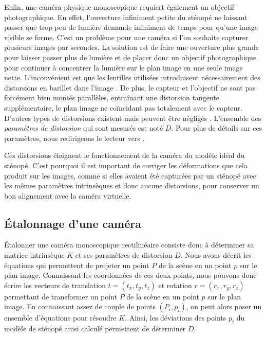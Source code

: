 Enfin, une caméra physique monoscopique requiert également un objectif photographique. En effet, l'ouverture infiniment petite du sténopé ne laissant passer que trop peu de lumière demande infiniment de temps pour qu'une image visible se forme. C'est un problème pour une caméra si l'on souhaite capturer plusieurs images par secondes. La solution est de faire une ouverture plus grande pour laisser passer plus de lumière et de placer donc un objectif photographique pour continuer à concentrer la lumière sur le plan image en une seule image nette. L'inconvénient est que les lentilles utilisées introduisent nécessairement des distorsions en barillet dans l'image . De plus, le capteur et l'objectif ne sont pas forcément bien montés parallèles, entraînant une distorsion tangente supplémentaire, le plan image ne coïncidant pas totalement avec le capteur. D'autres types de distorsions existent mais peuvent être négligés \citep[p. 377]{Bradski2008}. L'ensemble des \emph{paramètres de distorsion} qui sont mesurés est noté $D$. Pour plus de détails sur ces paramètres, nous redirigeons le lecteur vers \cite[p. 375]{Bradski2008}.


Ces distorsions éloignent le fonctionnement de la caméra du modèle idéal du sténopé. C'est pourquoi il est important de corriger les déformations que cela produit sur les images, comme si elles avaient été capturées par un sténopé avec les mêmes paramètres intrinsèques et donc aucune distorsions, pour conserver un bon alignement avec la caméra virtuelle.

\subsection{Étalonnage d'une caméra}
\label{subsec:pinhole_camera_calibration}

Étalonner une caméra monoscopique rectilinéaire consiste donc à déterminer sa matrice intrinsèque $K$ et ses paramètres de distorsion $D$. Nous avons décrit les équations qui permettent de projeter un point $P$ de la scène en un point $p$ sur le plan image. Connaissant les coordonnées de ces deux points, nous pouvons donc écrire les vecteurs de translation $t = (t_x, t_y, t_z)$ et rotation $r = (r_x, r_y, r_z)$ permettant de transformer un point $P$ de la scène en un point $p$ sur le plan image. En connaissant assez de couple de points $(P_i, p_i)$, on peut alors poser un ensemble d'équations pour résoudre $K$. Ainsi, les déviations des points $p_i$ du modèle de sténopé ainsi calculé permettent de déterminer $D$.

